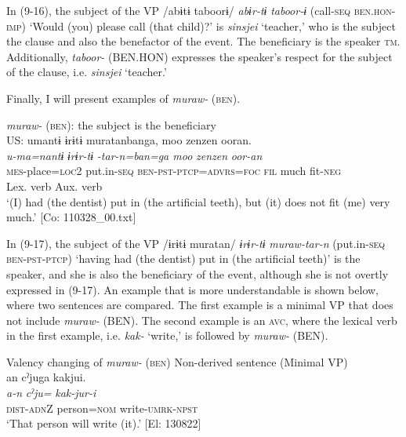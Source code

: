 In (9-16), the subject of the VP /abɨtɨ taboorɨ/ \textit{abɨr-tɨ} \textit{taboor-ɨ} (call-\textsc{seq} \textsc{ben}.\textsc{hon}-\textsc{imp}) ‘Would (you) please call (that child)?’ is \textit{sinsjei} ‘teacher,’ who is the subject the clause and also the benefactor of the event. The beneficiary is the speaker \textsc{tm}. Additionally, \textit{taboor-} (BEN.HON) expresses the speaker’s respect for the subject of the clause, i.e. \textit{sinsjei} ‘teacher.’

Finally, I will present examples of \textit{muraw-} (\textsc{ben}).

\ea   \textit{muraw-} (\textsc{ben}): the subject is the beneficiary\label{ex:9.17}\\
US: \gllll    umantɨ  ɨrɨtɨ  muratanbanga,  {\textbar}moo  zenzen{\textbar}  ooran.    \\
    \textit{u-ma=nantɨ}  \textit{ɨrɨr-tɨ}  \textit{-tar-n=ban=ga  moo}   \textit{zenzen}  \textit{oor-an}    \\
    \textsc{mes}-place=\textsc{loc}2  put.in-\textsc{seq}  \textsc{ben}-\textsc{pst}-\textsc{ptcp}=\textsc{advrs}=\textsc{foc}  \textsc{fil}   much  fit-\textsc{neg}    \\
     {} {Lex. verb}  {Aux. verb}     \\
    \glt     ‘(I) had (the dentist) put in (the artificial teeth), but (it) does not fit (me) very much.’ [Co: 110328\_00.txt]
\z

In (9-17), the subject of the VP /ɨrɨtɨ muratan/ \textit{ɨrɨr-tɨ} \textit{muraw-tar-n} (put.in-\textsc{seq} \textsc{ben}-\textsc{pst}-\textsc{ptcp}) ‘having had (the dentist) put in (the artificial teeth)’ is the speaker, and she is also the beneficiary of the event, although she is not overtly expressed in (9-17). An example that is more understandable is shown below, where two sentences are compared. The first example is a minimal VP that does not include \textit{muraw-} (BEN). The second example is an \textsc{avc}, where the lexical verb in the first example, i.e. \textit{kak-} ‘write,’ is followed by \textit{muraw-} (BEN).

\ea   Valency changing of \textit{muraw-} (\textsc{ben}) \label{ex:9.18}
  \ea Non-derived sentence (Minimal VP)\label{ex:9.18a}\\
\glll     an  cˀjuga  kakjui.\\
      \textit{a-n}  \textit{cˀju=}  \textit{kak-jur-i}\\
      \textsc{dist}-\textsc{adn}Z  person=\textsc{nom}  write-\textsc{umrk}-\textsc{npst}\\
      \glt       ‘That person will write (it).’ [El: 130822]

